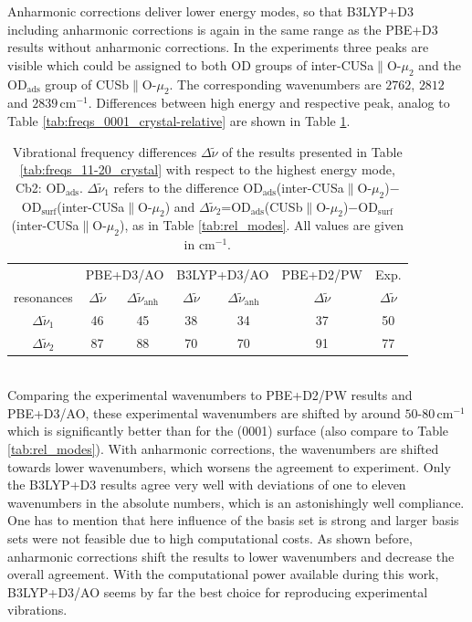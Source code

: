 \documentclass[11pt,DIV=13,BCOR=5mm,a4paper,headinclude]{scrbook}
\begin{document}
Anharmonic corrections deliver lower energy modes, so that B3LYP+D3 including anharmonic corrections is again in the same range as the PBE+D3 results without anharmonic corrections.
In the experiments \cite{Heiden11-20_2018} three peaks are visible which could be assigned to both OD groups of inter-CUSa$\parallel$O-$\mu_2$ and the OD$_\textrm{ads}$ group of CUSb$\parallel$O-$\mu_2$.
The corresponding wavenumbers are $2762$, $2812$ and $2839\,$cm$^{-1}$.
Differences between high energy and respective peak, analog to Table \ref{tab:freqs_0001_crystal-relative} are shown in Table \ref{tab:freqs_11-20_crystal-relative}.
\begin{table}[!h]
  \centering
  \caption{Vibrational frequency differences $\Delta \tilde{\nu}$ of the results presented in Table \ref{tab:freqs_11-20_crystal} with respect to the highest energy mode, Cb2: OD$_\textrm{ads}$.
  $\Delta \tilde{\nu}_1$ refers to the difference OD$_\textrm{ads}$(inter-CUSa$\parallel$O-$\mu_2$)$-$OD$_\textrm{surf}$(inter-CUSa$\parallel$O-$\mu_2$) and $\Delta \tilde{\nu}_2$=OD$_\textrm{ads}$(CUSb$\parallel$O-$\mu_2$)$-$OD$_\textrm{surf}$(inter-CUSa$\parallel$O-$\mu_2$), as in Table \ref{tab:rel_modes}.
All values are given in cm$^{-1}$.}
  \begin{tabular}{c|cc|cc|c|c}
  \toprule
   & \multicolumn{2}{c}{PBE+D3/AO} & \multicolumn{2}{c}{B3LYP+D3/AO}&PBE+D2/PW&Exp.\cite{Heiden11-20_2018}\\
  resonances & $\Delta\tilde{\nu}$  & $\Delta\tilde{\nu}_\textrm{anh}$ &  $\Delta\tilde{\nu}$  & $\Delta\tilde{\nu}_\textrm{anh}$&$\Delta\tilde{\nu}$  &$\Delta\tilde{\nu}$\\\midrule
$\Delta \tilde{\nu}_1$ & 46 & 45 & 38 & 34 & 37 & 50\\
$\Delta \tilde{\nu}_2$  & 87 & 88 & 70 & 70 & 91 & 77\\\bottomrule
    \end{tabular}
  \label{tab:freqs_11-20_crystal-relative}
\end{table}
\\

Comparing the experimental wavenumbers to PBE+D2/PW results and PBE+D3/AO, these experimental wavenumbers are shifted by around $50$-$80\,$cm$^{-1}$ which is significantly better than for the (0001) surface (also compare to Table \ref{tab:rel_modes}).
With anharmonic corrections, the wavenumbers are shifted towards lower wavenumbers, which worsens the agreement to experiment.
Only the B3LYP+D3 results agree very well with deviations of one to eleven wavenumbers in the absolute numbers, which is an astonishingly well compliance.
One has to mention that here influence of the basis set is strong and larger basis sets were not feasible due to high computational costs.
As shown before, anharmonic corrections shift the results to lower wavenumbers and decrease the overall agreement.
With the computational power available during this work, B3LYP+D3/AO seems by far the best choice for reproducing experimental vibrations.
\end{document}
